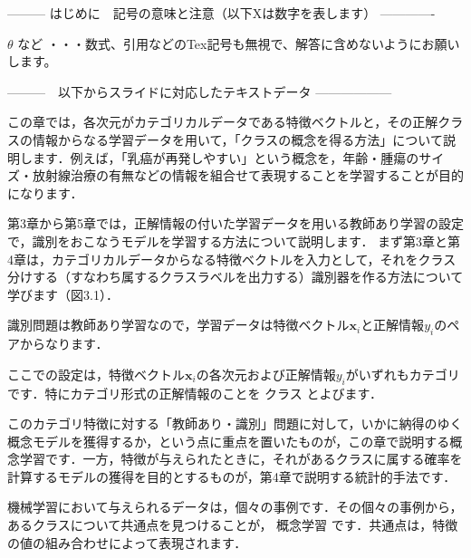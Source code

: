 --------- はじめに　記号の意味と注意（以下Xは数字を表します） -------------

$\theta$ など       ・・・数式、引用などのTex記号も無視で、解答に含めないようにお願いします。
\cite{mitchell97}

---------　以下からスライドに対応したテキストデータ ------------------


この章では，各次元がカテゴリカルデータである特徴ベクトルと，その正解クラスの情報からなる学習データを用いて，「クラスの概念を得る方法」について説明します．例えば，「乳癌が再発しやすい」という概念を，年齢・腫瘍のサイズ・放射線治療の有無などの情報を組合せて表現することを学習することが目的になります．


第3章から第5章では，正解情報の付いた学習データを用いる教師あり学習の設定で，識別をおこなうモデルを学習する方法について説明します．
まず第3章と第4章は，カテゴリカルデータからなる特徴ベクトルを入力として，それをクラス分けする（すなわち属するクラスラベルを出力する）識別器を作る方法について学びます（図3.1）．

識別問題は教師あり学習なので，学習データは特徴ベクトル$\bm{x}_i$と正解情報$y_i$のペアからなります．

ここでの設定は，特徴ベクトル$\bm{x}_i$の各次元および正解情報$y_i$がいずれもカテゴリです．特にカテゴリ形式の正解情報のことを
クラス
とよびます．

このカテゴリ特徴に対する「教師あり・識別」問題に対して，いかに納得のゆく概念モデルを獲得するか，という点に重点を置いたものが，この章で説明する概念学習です．一方，特徴が与えられたときに，それがあるクラスに属する確率を計算するモデルの獲得を目的とするものが，第4章で説明する統計的手法です．


機械学習において与えられるデータは，個々の事例です．その個々の事例から，あるクラスについて共通点を見つけることが，
概念学習
です．共通点は，特徴の値の組み合わせによって表現されます．



